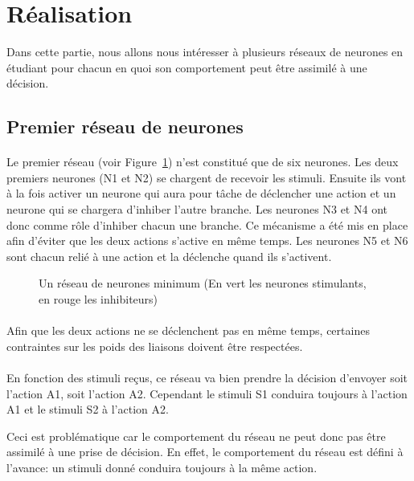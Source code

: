 \section{Réalisation}
Dans cette partie, nous allons nous intéresser à plusieurs réseaux de neurones
en étudiant pour chacun en quoi son comportement peut être assimilé à une
décision.


\subsection{Premier réseau de neurones}
\paragraph{}
Le premier réseau (voir Figure~\ref{reseau1}) n'est constitué que de six
neurones. Les deux premiers neurones (N1 et N2) se chargent de recevoir
les stimuli. Ensuite ils vont à la fois activer un neurone qui aura pour
tâche de déclencher une action et un neurone qui se chargera d'inhiber
l'autre branche. Les neurones N3 et N4 ont donc comme rôle d'inhiber chacun
une branche. Ce mécanisme a été mis en place afin d'éviter que les deux
actions s'active en même temps. Les neurones N5 et N6 sont chacun relié
à une action et la déclenche quand ils s'activent.

\begin{figure}[!h]
  \begin{center}
    
  \end{center}
  \caption{Un réseau de neurones minimum (En vert les neurones stimulants, en rouge les inhibiteurs)}
  \label{reseau1}
\end{figure}

\paragraph{}
Afin que les deux actions ne se déclenchent pas en même temps, certaines
contraintes sur les poids des liaisons doivent être respectées.

\paragraph{}
En fonction des stimuli reçus, ce réseau va bien prendre la décision
d'envoyer soit l'action A1, soit l'action A2. Cependant le
stimuli S1 conduira toujours à l'action A1 et le stimuli S2 à
l'action A2.

Ceci est problématique car le comportement du réseau ne peut donc pas
être assimilé à une prise de décision. En effet, le comportement du réseau
est défini à l'avance: un stimuli donné conduira toujours à la même action.

